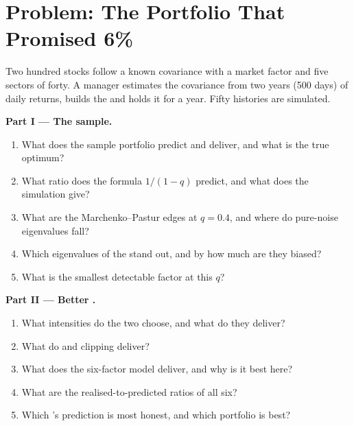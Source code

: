 \section{Problem: The Portfolio That Promised 6\%}

\begin{problem}\label{pb:qm:covariance-estimation-and-random-matrices:1}
Two hundred stocks follow a known covariance with a market factor and five sectors of forty. A manager estimates the covariance from two years (500 days) of daily returns, builds the
 and holds it for a year. Fifty histories are simulated.

\medskip\noindent\textbf{Part I --- The sample.}
\begin{enumerate}
\item What does the sample portfolio predict and deliver, and what is the true optimum?
\item What ratio does the formula $1/(1 - q)$ predict, and what does the simulation give?
\item What are the Marchenko--Pastur edges at $q = 0.4$, and where do pure-noise eigenvalues fall?
\item Which eigenvalues of the  stand out, and by how much are they biased?
\item What is the smallest detectable factor at this $q$?
\end{enumerate}

\medskip\noindent\textbf{Part II --- Better .}
\begin{enumerate}[resume]
\item What intensities do the two  choose, and what do they deliver?
\item What do  and clipping deliver?
\item What does the six-factor model deliver, and why is it best here?
\item What are the realised-to-predicted ratios of all six?
\item Which 's prediction is most honest, and which portfolio is best?
\end{enumerate}


\end{problem}

